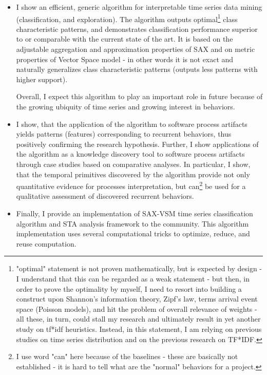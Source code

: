 \documentclass[12pt,oneside]{article}
\numberwithin{equation}{subsection}
\begin{document}
\begin{itemize}

\item 
I show an efficient, generic algorithm for interpretable time series data mining (classification,
and exploration). The algorithm outputs optimal\footnote{"optimal" statement is not proven
mathematically, but is expected by design - I understand that this can be regarded as a weak
statement - but then, in order to prove the optimality by myself, I need to resort into building a
construct upon Shannon's information theory, Zipf's law, terms arrival event space (Poisson models),
and hit the problem of overall relevance of weights - all these, in turn, could stall my research
and ultimately result in yet another study on tf*idf heuristics. Instead, in this statement, I am
relying on previous studies on time series distribution and on the previous research on TF*IDF.}
class characteristic patterns, and demonstrates classification performance superior to or comparable
with the current state of the art. It is based on the adjustable aggregation and
approximation properties of SAX and on metric properties of Vector Space model - in other words it
is not exact and naturally generalizes class characteristic patterns (outputs less patterns with
higher support). 

Overall, I expect this algorithm to play an important role in future because of the growing ubiquity
of time series and growing interest in behaviors.

\item 
I show, that the application of the algorithm to software process artifacts yields patterns
(features) corresponding to recurrent behaviors, thus positively confirming the research
hypothesis. Further, I show applications of the algorithm as a knowledge discovery tool to software
process artifacts through case studies based on comparative analyses. In particular, I show, that
the temporal primitives discovered by the algorithm provide not only quantitative evidence for
processes interpretation, but can\footnote{ I use word "can" here because of the baselines - these
are basically not established - it is hard to tell what are the "normal" behaviors for a project.} 
be used for a qualitative assessment of discovered recurrent behaviors.

\item 
Finally, I provide an implementation of SAX-VSM time series classification algorithm and STA
analysis framework to the community. This algorithm implementation uses several computational
tricks to optimize, reduce, and reuse computation. 
\end{itemize}
\end{document}
